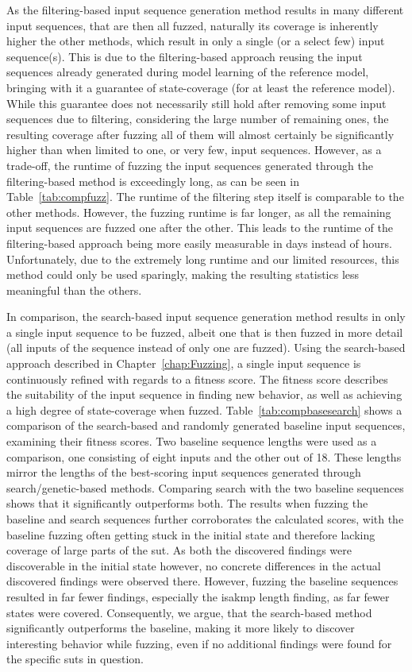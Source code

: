 As the filtering-based input sequence generation method results in many different input sequences, that are then all fuzzed, naturally its coverage is inherently higher the other methods, which result in only a single (or a select few) input sequence(s). This is due to the filtering-based approach reusing the input sequences already generated during model learning of the reference model, bringing with it a guarantee of state-coverage (for at least the reference model). While this guarantee does not necessarily still hold after removing some input sequences due to filtering, considering the large number of remaining ones, the resulting coverage after fuzzing all of them will almost certainly be significantly higher than when limited to one, or very few, input sequences. However, as a trade-off, the runtime of fuzzing the input sequences generated through the filtering-based method is exceedingly long, as can be seen in Table~\ref{tab:compfuzz}. The runtime of the filtering step itself is comparable to the other methods. However, the fuzzing runtime is far longer, as all the remaining input sequences are fuzzed one after the other. This leads to the runtime of the filtering-based approach being more easily measurable in days instead of hours. Unfortunately, due to the extremely long runtime and our limited resources, this method could only be used sparingly, making the resulting statistics less meaningful than the others. 

In comparison, the search-based input sequence generation method results in only a single input sequence to be fuzzed, albeit one that is then fuzzed in more detail (all inputs of the sequence instead of only one are fuzzed). Using the search-based approach described in Chapter~\ref{chap:Fuzzing}, a single input sequence is continuously refined with regards to a fitness score. The fitness score describes the suitability of the input sequence in finding new behavior, as well as achieving a high degree of state-coverage when fuzzed. Table~\ref{tab:compbasesearch} shows a comparison of the search-based and randomly generated baseline input sequences, examining their fitness scores. Two baseline sequence lengths were used as a comparison, one consisting of eight inputs and the other out of 18. These lengths mirror the lengths of the best-scoring input sequences generated through search/genetic-based methods. Comparing search with the two baseline sequences shows that it significantly outperforms both. The results when fuzzing the baseline and search sequences further corroborates the calculated scores, with the baseline fuzzing often getting stuck in the initial state and therefore lacking coverage of large parts of the \ac{sut}. As both the discovered findings were discoverable in the initial state however, no concrete differences in the actual discovered findings were observed there. However, fuzzing the baseline sequences resulted in far fewer findings, especially the \ac{isakmp} length finding, as far fewer states were covered. Consequently, we argue, that the search-based method significantly outperforms the baseline, making it more likely to discover interesting behavior while fuzzing, even if no additional findings were found for the specific \acp{sut} in question.


